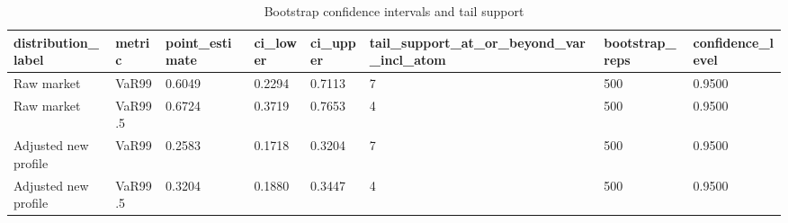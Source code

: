 \begin{table}[htbp]
\centering
\caption{Bootstrap confidence intervals and tail support}
\label{tab:v2_boot}
\begin{tabular}{llllllll}
\toprule
\textbf{distribution_label} & \textbf{metric} & \textbf{point_estimate} & \textbf{ci_lower} & \textbf{ci_upper} & \textbf{tail_support_at_or_beyond_var_incl_atom} & \textbf{bootstrap_reps} & \textbf{confidence_level} \\
\midrule
Raw market & VaR99 & 0.6049 & 0.2294 & 0.7113 & 7 & 500 & 0.9500 \\
Raw market & VaR99.5 & 0.6724 & 0.3719 & 0.7653 & 4 & 500 & 0.9500 \\
Adjusted new profile & VaR99 & 0.2583 & 0.1718 & 0.3204 & 7 & 500 & 0.9500 \\
Adjusted new profile & VaR99.5 & 0.3204 & 0.1880 & 0.3447 & 4 & 500 & 0.9500 \\
\bottomrule
\end{tabular}
\end{table}
